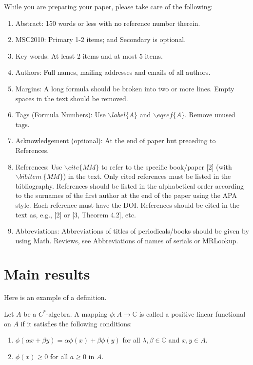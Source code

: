 \documentclass[12pt, reqno]{amsart}
\numberwithin{equation}{section}
\begin{document}
While you are preparing your paper, please take care of the
following:
\begin{enumerate}
\item Abstract: 150 words or less with no reference number therein.\\
\item MSC2010: Primary 1-2 items; and Secondary is optional.\\

\item Key words: At least 2 items and at most 5 items.\\
\item Authors: Full names, mailing addresses and emails of all authors.\\
\item Margins: A long formula should be broken into two or more lines. Empty spaces in the text should be removed.\\
\item Tags (Formula Numbers): Use $\backslash label\{A\}$ and $\backslash eqref\{A\}$. Remove unused tags. \\
\item Acknowledgement (optional): At the end of paper  but preceding to References.\\
\item References: Use $\backslash cite\{MM\}$ to refer to the specific book/paper [2] (with $\backslash bibitem~\{MM\}$) in the text. Only cited references must be listed in the bibliography. References should be listed in the alphabetical order according to the surnames of the first author at the end of the paper using the APA style. Each reference must have the DOI.
References should be cited in the text as, e.g., [2] or [3, Theorem 4.2], etc.  \\
\item Abbreviations: Abbreviations of titles of periodicals/books should be given by using Math. Reviews, see Abbreviations of names of serials or MRLookup.

\end{enumerate}

\section{Main results}

Here is an example of a definition.

\begin{definition} Let $A$ be a $C^*$-algebra. A mapping
$\phi :A\rightarrow \mathbb{C} $ is
called a positive linear functional on $A$ if it satisfies the following conditions:

\begin{enumerate}

\item $\phi(\alpha x+\beta y)=\alpha \phi(x)+\beta\phi(y)$ for all $\lambda ,\beta \in  \mathbb{C}$ and $x,y\in A$.

\item $\phi(x)\geq 0$ for all $a\geq 0$ in $A$.
\end{enumerate}
\end{definition}
\end{document}
